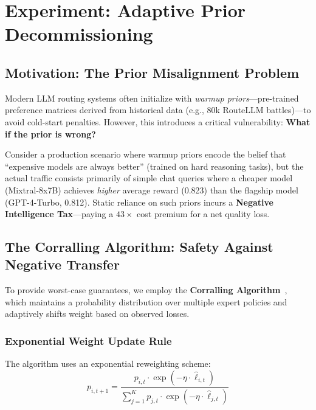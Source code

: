 
\section{Experiment: Adaptive Prior Decommissioning}
\label{sec:corralling}

\subsection{Motivation: The Prior Misalignment Problem}

Modern LLM routing systems often initialize with \emph{warmup priors}---pre-trained preference matrices derived from historical data (e.g., 80k RouteLLM battles)---to avoid cold-start penalties. However, this introduces a critical vulnerability: \textbf{What if the prior is wrong?}

Consider a production scenario where warmup priors encode the belief that ``expensive models are always better'' (trained on hard reasoning tasks), but the actual traffic consists primarily of simple chat queries where a cheaper model (Mixtral-8x7B) achieves \emph{higher} average reward (0.823) than the flagship model (GPT-4-Turbo, 0.812). Static reliance on such priors incurs a \textbf{Negative Intelligence Tax}---paying a $43\times$ cost premium for a net quality loss.

\subsection{The Corralling Algorithm: Safety Against Negative Transfer}

To provide worst-case guarantees, we employ the \textbf{Corralling Algorithm}~\cite{agarwal2017corralling}, which maintains a probability distribution over multiple expert policies and adaptively shifts weight based on observed losses.

\subsubsection{Exponential Weight Update Rule}

The algorithm uses an exponential reweighting scheme:
\begin{equation}
p_{i,t+1} = \frac{p_{i,t} \cdot \exp(-\eta \cdot \hat{\ell}_{i,t})}{\sum_{j=1}^{K} p_{j,t} \cdot \exp(-\eta \cdot \hat{\ell}_{j,t})}
\label{eq:corralling}
\end{equation}

